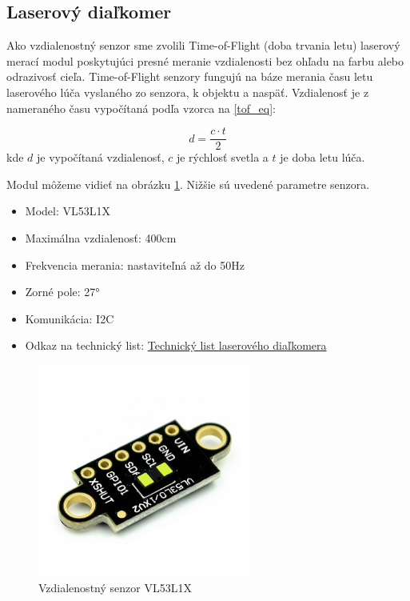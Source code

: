 \subsection{Laserový diaľkomer}
Ako vzdialenostný senzor sme zvolili Time-of-Flight (doba trvania letu) laserový merací modul poskytujúci presné meranie vzdialenosti bez ohľadu na farbu alebo odrazivosť cieľa. 
Time-of-Flight senzory fungujú na báze merania času letu laserového lúča vyslaného zo senzora, k objektu a naspäť. Vzdialenosť je z nameraného času vypočítaná podľa vzorca na \ref{tof_eq}:

\begin{equation}
\label{tof_eq}
d = \frac{c \cdot t}{2}
\end{equation}
kde $d$ je vypočítaná vzdialenosť, $c$ je rýchlosť svetla a $t$ je doba letu lúča.

Modul môžeme vidieť na obrázku  \ref{fig:vl53l1x}. Nižšie sú uvedené parametre senzora.

\begin{itemize}

    \item Model: VL53L1X

    \item Maximálna vzdialenosť: 400cm

    \item Frekvencia merania: nastaviteľná až do 50Hz

    \item Zorné pole: 27°

    \item Komunikácia: I2C

    \item Odkaz na technický list: \href{https://www.st.com/resource/en/datasheet/vl53l1x.pdf}{Technický list laserového diaľkomera}

\end{itemize}

\begin{figure}[!htpb]
    \centering
    \includegraphics[width=7cm]{includes/images/vl53l1x.jpg}
    \caption{Vzdialenostný senzor VL53L1X}
    \label{fig:vl53l1x}
\end{figure}

